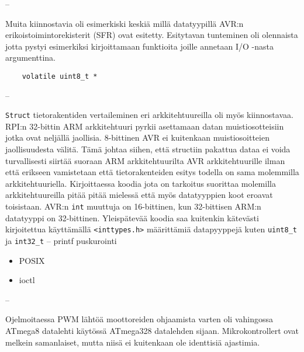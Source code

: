 \documentclass[]{article} %
\numberwithin{equation}{section}
\numberwithin{figure}{section}
\numberwithin{table}{section}
\begin{document}
--

Muita kiinnostavia oli esimerkiski keskiä millä datatyypillä AVR:n erikoistoimintorekisterit (SFR) ovat esitetty.
Esitytavan tunteminen oli olennaista jotta pystyi esimerkiksi kirjoittamaan funktioita joille annetaan I/O -nasta argumenttina.

\begin{verbatim}
    volatile uint8_t *
\end{verbatim}

--    

\verb+Struct+ tietorakentiden vertaileminen eri arkkitehtuureilla oli myös kiinnostavaa.
RPI:n 32-bittin ARM arkkitehtuuri pyrkii asettamaan datan muistiosotteisiin jotka ovat neljällä jaollisia. 8-bittinen AVR ei kuitenkaan muistiosoitteien jaollisuudesta välitä.
Tämä johtaa siihen, että structiin pakattua dataa ei voida turvallisesti siirtää suoraan ARM arkkitehtuurilta AVR arkkitehtuurille ilman että erikseen vamistetaan että tietorakenteiden esitys todella on sama molemmilla arkkitehtuuriella.
Kirjoittaessa koodia jota on tarkoitus suorittaa molemilla arkkitehtuureilla pitää pitää mielessä että myös datatyyppien koot eroavat toisistaan. AVR:n \verb+int+ muuttuja on 16-bittinen, kun 32-bittisen ARM:n datatyyppi on 32-bittinen.
Yleispätevää koodia saa kuitenkin kätevästi kirjoitettua käyttämällä \verb+<inttypes.h>+ määrittämiä datapyyppejä kuten \verb+uint8_t+ ja \verb+int32_t+
--
printf puskurointi

\begin{itemize}
    \item POSIX
    \item ioctl
    
\end{itemize}

  
--

Ojelmoitaessa PWM lähtöä moottoreiden ohjaamista varten oli vahingossa ATmega8 datalehti käytössä ATmega328 datalehden sijaan. Mikrokontrollert ovat melkein samanlaiset, mutta niisä ei kuitenkaan ole identtisiä ajastimia. 
\end{document}
